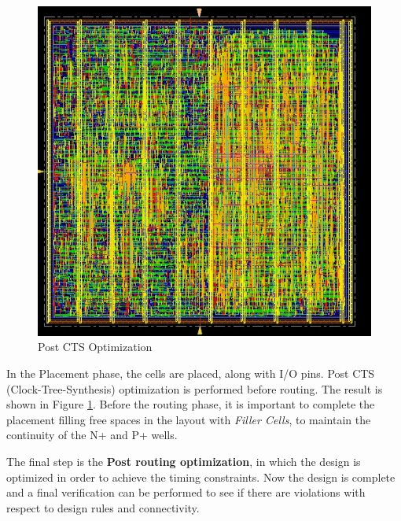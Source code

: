 \begin{figure}[ht]
	\centering
	\includegraphics[width=\textwidth]{chapters/figures/7.Post_CTS_optimization.jpg} 
	\caption{Post CTS Optimization}
	\label{fig:CTS_OPT}  %
	\end{figure}

In the Placement phase, the cells are placed, along with I/O pins. Post CTS (Clock-Tree-Synthesis) optimization is performed before routing.
The result is shown in Figure \ref{fig:CTS_OPT}.
Before the routing phase, it is important to complete the placement filling free spaces in the layout with \textit{Filler Cells}, to maintain the continuity of the N+ and P+ wells.

The final step is the \textbf{Post routing optimization}, in which the design is optimized in order to achieve the timing constraints.
Now the design is complete and a final verification can be performed to see if there are violations with respect to design rules and connectivity.

